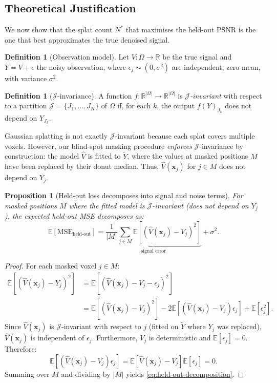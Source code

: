 \documentclass[11pt, a4paper]{article}
\theoremstyle{plain}
\newtheorem{proposition}[theorem]{Proposition}
\theoremstyle{definition}
\newtheorem{definition}[theorem]{Definition}
\theoremstyle{remark}
\newcommand{\R}{\mathbb{R}}
\newcommand{\E}{\mathbb{E}}
\newcommand{\bx}{\bm{x}}
\newcommand{\MSE}{\mathrm{MSE}}
\newcommand{\Jcal}{\mathcal{J}}
\begin{document}
\subsection{Theoretical Justification}
\label{sec:n2s-theory}

We now show that the splat count $N^*$ that maximises the held-out PSNR
is the one that best approximates the true denoised signal.

\begin{definition}[Observation model]
Let $V:\Omega \to \R$ be the true signal and $Y = V + \epsilon$ the
noisy observation, where $\epsilon_j \sim (0, \sigma^2)$ are independent,
zero-mean, with variance $\sigma^2$.
\end{definition}

\begin{definition}[$\Jcal$-invariance]
A function $f: \R^{|\Omega|} \to \R^{|\Omega|}$ is
\emph{$\Jcal$-invariant} with respect to a partition
$\Jcal = \{J_1, \ldots, J_K\}$ of $\Omega$ if, for each $k$, the
output $f(Y)_{J_k}$ does not depend on $Y_{J_k}$.
\end{definition}

Gaussian splatting is not exactly $\Jcal$-invariant because each splat
covers multiple voxels. However, our blind-spot masking procedure
\emph{enforces} $\Jcal$-invariance by construction: the model $\hat{V}$
is fitted to $\tilde{Y}$, where the values at masked positions $M$
have been replaced by their donut median. Thus, $\hat{V}(\bx_j)$ for
$j \in M$ does not depend on $Y_j$.

\begin{proposition}[Held-out loss decomposes into signal and noise terms]
\label{prop:held-out-decomposition}
For masked positions $M$ where the fitted model is $\Jcal$-invariant
(does not depend on $Y_j$), the expected held-out MSE decomposes as:
\begin{equation}
  \E\left[\MSE_{\text{held-out}}\right]
  = \underbrace{\frac{1}{|M|}\sum_{j\in M}
    \E\left[(\hat{V}(\bx_j) - V_j)^2\right]}_{\text{signal error}}
  + \sigma^2.
  \label{eq:held-out-decomposition}
\end{equation}
\end{proposition}

\begin{proof}
For each masked voxel $j \in M$:
\begin{align}
  \E\left[(\hat{V}(\bx_j) - Y_j)^2\right]
  &= \E\left[(\hat{V}(\bx_j) - V_j - \epsilon_j)^2\right] \\
  &= \E\left[(\hat{V}(\bx_j) - V_j)^2\right]
     - 2\E\left[(\hat{V}(\bx_j) - V_j)\epsilon_j\right]
     + \E[\epsilon_j^2].
\end{align}
Since $\hat{V}(\bx_j)$ is $\Jcal$-invariant with respect to $j$
(fitted on $\tilde{Y}$ where $Y_j$ was replaced), $\hat{V}(\bx_j)$
is independent of $\epsilon_j$. Furthermore, $V_j$ is deterministic
and $\E[\epsilon_j] = 0$. Therefore:
\begin{equation}
  \E\left[(\hat{V}(\bx_j) - V_j)\epsilon_j\right]
  = \E\left[\hat{V}(\bx_j) - V_j\right]\E[\epsilon_j] = 0.
\end{equation}
Summing over $M$ and dividing by $|M|$ yields
\cref{eq:held-out-decomposition}.
\end{proof}
\end{document}
